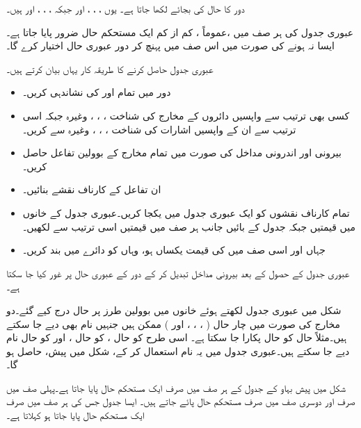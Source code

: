  دور کا حال   کی بجائے   لکھا جاتا ہے۔ یوں  ، ، ، اور   جبکہ ، ، ، اور  ہیں۔
 
عبوری جدول کی  ہر صف میں ،عموماً ، کم از کم ایک مستحکم حال ضرور پایا جاتا ہے۔ایسا نہ ہونے کی صورت میں  اس صف میں پہنچ کر  دور  عبوری حال اختیار کرے گا۔

عبوری جدول حاصل کرنے کا طریقہ  کار  یہاں بیان کرتے ہیں۔
\begin{itemize}
\item
دور میں      تمام   اور  کی نشاندہی  کریں۔
\item
 کسی بھی ترتیب سے واپسیں دائروں کے مخارج کی شناخت ، ، ، وغیرہ جبکہ اسی ترتیب سے ان کے واپسیں اشارات کی شناخت ،  ، ،  وغیرہ سے  کریں۔
\item
 بیرونی اور اندرونی مداخل کی صورت میں        تمام مخارج کے بوولین تفاعل حاصل کریں۔
\item    
    ان تفاعل کے کارناف نقشے بنائیں۔
\item 
  تمام کارناف نقشوں کو ایک عبوری جدول میں یکجا کریں۔عبوری جدول کے خانوں میں      قیمتیں جبکہ جدول کے بائیں جانب ہر صف میں    قیمتیں اسی ترتیب سے لکھیں۔
\item    
     جہاں  اور اسی صف میں  کی قیمت یکساں ہو، وہاں  کو دائرے میں بند کریں۔
    \end{itemize}
عبوری جدول کے حصول کے بعد بیرونی مداخل تبدیل کر کے دور کے عبوری حال   پر غور کیا  جا سکتا ہے۔ 

شکل میں عبوری جدول لکھتے   ہوئے  خانوں میں بوولین طرز  پر حال  درج کیے  گئے۔دو مخارج کی صورت میں  چار  حال (  ، ، ، اور  ) ممکن ہیں جنہیں  نام بھی دیے جا سکتے ہیں۔مثلاً حال   کو حال  پکارا جا سکتا ہے۔ اسی طرح  کو حال ،  کو حال ، اور  کو  حال  نام دیے جا سکتے ہیں۔عبوری جدول میں یہ نام استعمال کر کے، شکل   میں پیش،    حاصل ہو گا۔

شکل     میں پیش  بہاو کے جدول کے ہر صف میں صرف ایک  مستحکم حال پایا جاتا  ہے۔پہلی صف میں صرف     اور دوسری صف میں صرف   مستحکم حال  پائے جاتے ہیں۔ ایسا جدول جس  کی ہر  صف میں صرف ایک مستحکم حال  پایا جاتا  ہو  کہلاتا ہے۔


